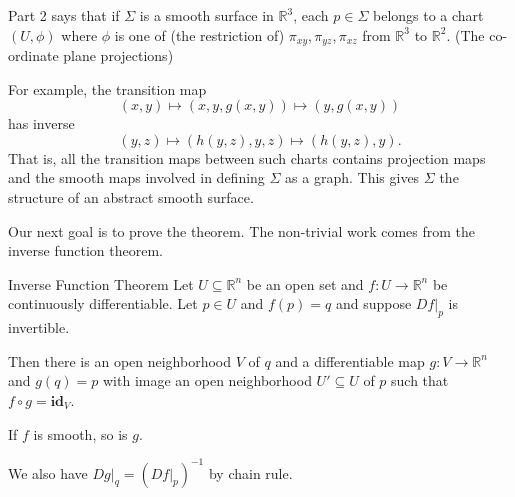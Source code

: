 \begin{remark}
    Part 2 says that if \(\Sigma\) is a smooth surface in \(\mathbb{R}^3\), each \(p \in \Sigma\) belongs to a chart \((U, \phi)\) where \(\phi\) is one of (the restriction of) \(\pi_{xy},\pi_{yz},\pi_{xz}\) from \(\mathbb{R}^3\) to \(\mathbb{R}^2\). (The co-ordinate plane projections)

    For example, the transition map
    \[
        (x,y) \mapsto (x,y,g(x,y)) \mapsto (y,g(x,y))
    \]
    has inverse
    \[
        (y,z) \mapsto (h(y,z),y,z) \mapsto (h(y,z),y).
    \]
    That is, all the transition maps between such charts contains projection maps and the smooth maps involved in defining \(\Sigma\) as a graph. This gives \(\Sigma\) the structure of an abstract smooth surface.
\end{remark}

Our next goal is to prove the theorem. The non-trivial work comes from the inverse function theorem.
\begin{theorem}{Inverse Function Theorem}{}
    Let \(U\subseteq \mathbb{R}^n\) be an open set and \(f: U \to \mathbb{R}^n\) be continuously differentiable. Let \(p \in U\) and \(f(p) = q\) and suppose \(\left. Df \right|_p\) is invertible.

    Then there is an open neighborhood \(V\) of \(q\) and a differentiable map \(g: V \to \mathbb{R}^n\) and \(g(q) = p\) with image an open neighborhood \(U' \subseteq U\) of \(p\) such that \(f \circ g = \textbf{id}_V\). 

    If \(f\) is smooth, so is \(g\).
\end{theorem}
\begin{remark}
    We also have \(\left.Dg\right|_q = (\left.Df\right|_p)^{-1}\) by chain rule.
\end{remark}